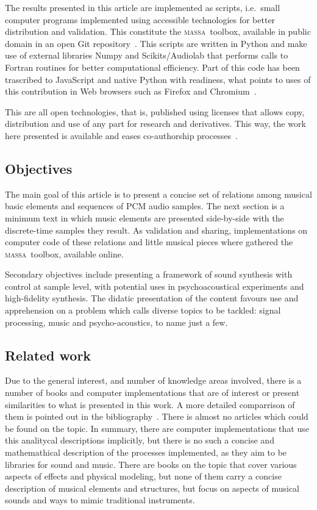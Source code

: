 \documentclass[
 aip,
 jmp,
 amsmath,amssymb,
 reprint,
]{revtex4-1}
\newcommand{\massa}{{\large \textsc{massa}}}
\begin{document}
The results presented in this article are implemented as scripts, i.e.\ small computer programs implemented using accessible technologies for better distribution and validation. This constitute the \massa\ toolbox, available in public domain in an open Git repository~\cite{gitBook}. This scripts are written in Python and make use of external libraries Numpy and Scikits/Audiolab that performs calls to Fortran routines for better computational efficiency. Part of this code has been trascribed to JavaScript and native Python with readiness, what points to uses of this contribution in Web browsers such as Firefox and Chromium~\cite{numpy, audiolab, tutpython, python}.

This are all open technologies, that is, published using licenses that allows copy, distribution and use of any part for research and derivatives. This way, the work here presented is available and eases co-authorship processes~\cite{Raymond,Lessig}. 

\subsection{Objectives}
\label{subsec:objectives}
The main goal of this article is to present a concise set of relations among musical basic elements and sequences of PCM audio samples. The next section is a minimum text in which music elements are presented side-by-side with the discrete-time samples they result. As validation and sharing, implementations on computer code of these relations and little musical pieces where gathered the \massa\ toolbox, available online.

Secondary objectives include presenting a framework of sound synthesis with control at sample level, with potential uses in psychoacoustical experiments and high-fidelity synthesis. The didatic presentation of the content favours use and apprehension on a problem which calls diverse topics to be tackled: signal processing, music and psycho-acoustics, to name just a few.

\subsection{Related work}
Due to the general interest, and number of knowledge areas involved, there is a number of books and computer implementations that are of interest or present similarities to what is presented in this work. A more detailed comparrison of them is pointed out in the bibliography~\cite{dissertacao}. There is almost no articles which could be found on the topic. In summary, there are computer implementations that use this analitycal descriptions implicitly, but there is no such a concise and mathemathical description of the processes implemented, as they aim to be libraries for sound and music. There are books on the topic that cover various aspects of effects and physical modeling, but none of them carry a concise description of musical elements and structures, but focus on aspects of musical sounds and ways to mimic traditional instruments.
\end{document}
